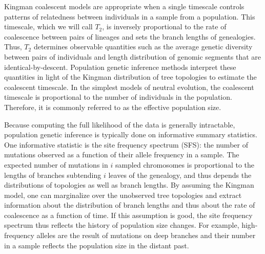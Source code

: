 \documentclass[11pt, letterpaper]{article}   	%
\begin{document}
Kingman coalescent models are appropriate when a single timescale controls patterns of relatedness between individuals in a sample from a population.
This timescale, which we will call $T_2$, is inversely proportional to the rate of coalescence between pairs of lineages and sets the branch lengths of genealogies.
Thus, $T_2$ determines observable quantities such as the average genetic diversity between pairs of individuals and length distribution of genomic segments that are identical-by-descent.
Population genetic inference methods interpret these quantities in light of the Kingman distribution of tree topologies to estimate the coalescent timescale.
In the simplest models of neutral evolution, the coalescent timescale is proportional to the number of individuals in the population. Therefore, it is commonly referred to as the effective population size.


Because computing the full likelihood of the data is generally intractable, population genetic inference is typically done on informative summary statistics.
One informative statistic is the site frequency spectrum (SFS): the number of mutations observed as a function of their allele frequency in a sample.
The expected number of mutations in $i$ sampled chromosomes is proportional to the lengths of branches subtending $i$ leaves of the genealogy, and thus depends the distributions of topologies as well as branch lengths.
By assuming the Kingman model, one can marginalize over the unobserved tree topologies and extract information about the distribution of branch lengths and thus about the rate of coalescence as a function of time.
If this assumption is good, the site frequency spectrum thus reflects the history of population size changes.
For example, high-frequency alleles are the result of mutations on deep branches and their number in a sample reflects the population size in the distant past. 
\end{document}
